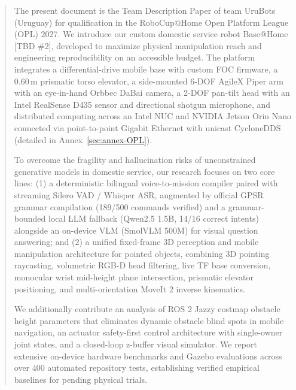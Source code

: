 \documentclass[runningheads,a4paper]{llncs}
\begin{document}
\begin{abstract}
The present document is the Team Description Paper of team UruBots (Uruguay) for qualification in the RoboCup@Home Open Platform League (OPL) 2027. We introduce our custom domestic service robot Base@Home [TBD \#2], developed to maximize physical manipulation reach and engineering reproducibility on an accessible budget. The platform integrates a differential-drive mobile base with custom FOC firmware, a $0.60\,\text{m}$ prismatic torso elevator, a side-mounted 6-DOF AgileX Piper arm with an eye-in-hand Orbbec DaBai camera, a 2-DOF pan-tilt head with an Intel RealSense D435 sensor and directional shotgun microphone, and distributed computing across an Intel NUC and NVIDIA Jetson Orin Nano connected via point-to-point Gigabit Ethernet with unicast CycloneDDS (detailed in Annex~\ref{sec:annex-OPL}).

To overcome the fragility and hallucination risks of unconstrained generative models in domestic service, our research focuses on two core lines: (1) a deterministic bilingual voice-to-mission compiler paired with streaming Silero VAD / Whisper ASR, augmented by official GPSR grammar compilation (189/500 commands verified) and a grammar-bounded local LLM fallback (Qwen2.5 1.5B, 14/16 correct intents) alongside an on-device VLM (SmolVLM 500M) for visual question answering; and (2) a unified fixed-frame 3D perception and mobile manipulation architecture for pointed objects, combining 3D pointing raycasting, volumetric RGB-D head filtering, live TF base conversion, monocular wrist mid-height plane intersection, prismatic elevator positioning, and multi-orientation MoveIt 2 inverse kinematics.

We additionally contribute an analysis of ROS 2 Jazzy costmap obstacle height parameters that eliminates dynamic obstacle blind spots in mobile navigation, an actuator safety-first control architecture with single-owner joint states, and a closed-loop z-buffer visual simulator. We report extensive on-device hardware benchmarks and Gazebo evaluations across over 400 automated repository tests, establishing verified empirical baselines for pending physical trials.

\end{abstract}
\end{document}
